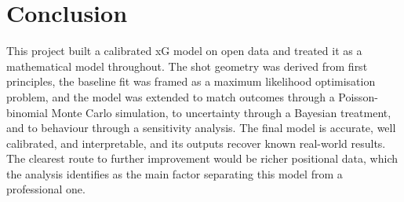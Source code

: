 \documentclass[11pt]{article}
\begin{document}
\section{Conclusion}

This project built a calibrated xG model on open data and treated it as a
mathematical model throughout. The shot geometry was derived from first
principles, the baseline fit was framed as a maximum likelihood optimisation
problem, and the model was extended to match outcomes through a Poisson-binomial
Monte Carlo simulation, to uncertainty through a Bayesian treatment, and to
behaviour through a sensitivity analysis. The final model is accurate, well
calibrated, and interpretable, and its outputs recover known real-world results.
The clearest route to further improvement would be richer positional data, which
the analysis identifies as the main factor separating this model from a
professional one.

\end{document}
